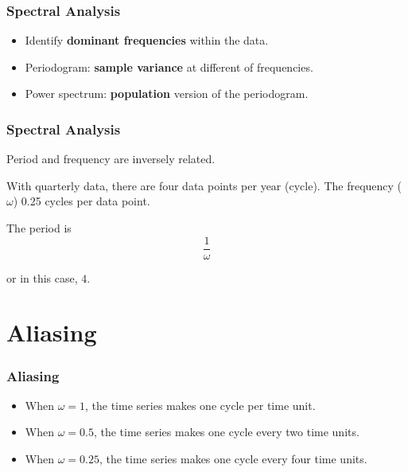 \documentclass[%
xcolor=pdftex]{beamer}
\begin{document}
\begin{frame}
\frametitle{Spectral Analysis}

\begin{itemize}
\item Identify \textbf{dominant frequencies} within the data.
\item Periodogram: \textbf{sample variance} at different of frequencies.
\item Power spectrum: \textbf{population} version of the periodogram.
\end{itemize}


\end{frame}


\begin{frame}
\frametitle{Spectral Analysis}

Period and frequency are inversely related.  
\newline

With quarterly data, there are four data points per year (cycle).  The frequency ($\omega$) 0.25 cycles per data point.  
\newline

The period is
$$
\frac{1}{\omega}
$$

or in this case, $4$.

\end{frame}

\section{Aliasing}
\frame{\tableofcontents[currentsection]}

\begin{frame}
\frametitle{Aliasing}

\begin{itemize}
\item When $\omega=1$, the time series makes one cycle per time unit.
\item When $\omega=0.5$, the time series makes one cycle every two time units.
\item When $\omega=0.25$, the time series makes one cycle every four time units.
\end{itemize}

\end{frame}
\end{document}
